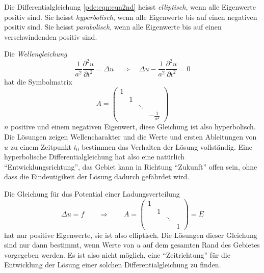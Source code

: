 \begin{definition}
Die Differentialgleichung
\eqref{pde:eqn:eqn2nd}
heisst {\em elliptisch}, wenn alle Eigenwerte positiv sind.
Sie heisst {\em hyperbolisch}, wenn alle Eigenwerte bis auf einen negativen
positiv sind.
Sie heisst {\em parabolisch}, wenn alle Eigenwerte bis auf einen
verschwindenden positiv sind.
\end{definition}
%
%
%
%
%
%

\begin{beispiel}
Die {\em Wellengleichung}
%
\[
\frac{1}{a^2}\frac{\partial^2 u}{\partial t^2}
=
\Delta u 
\quad\Rightarrow\quad
\Delta u 
-
\frac{1}{a^2}\frac{\partial^2 u}{\partial t^2}
=
0
\]
hat die Symbolmatrix
\[
A=
\begin{pmatrix}
1& &      &              \\
 &1&      &              \\
 & &\ddots&              \\
 & &      &\displaystyle-\frac{1}{a^2}
\end{pmatrix}
\]
$n$ positive und einem negativen Eigenwert, diese Gleichung ist also
hyperbolisch.
Die Lösungen zeigen Wellencharakter und die Werte und ersten
Ableitungen von $u$ zu einem Zeitpunkt $t_0$ bestimmen das Verhalten
der Lösung vollständig.
Eine hyperbolische Differentialgleichung hat also eine natürlich
``Entwicklungsrichtung'', das Gebiet kann in Richtung ``Zukunft''
offen sein, ohne dass die Eindeutigikeit der Lösung dadurch gefährdet wird.
\end{beispiel}

\begin{beispiel}
Die Gleichung für das Potential einer Ladungsverteilung
%
\[
\Delta u = f
\qquad\Rightarrow\qquad
A=
\begin{pmatrix}
1& &      & \\
 &1&      & \\
 & &\ddots& \\
 & &      &1
\end{pmatrix}
=E
\]
hat nur positive Eigenwerte, sie ist also elliptisch.
Die Lösungen dieser Gleichung sind nur dann bestimmt, wenn Werte von $u$
auf dem gesamten Rand des Gebietes vorgegeben werden.
Es ist also nicht möglich, eine ``Zeitrichtung'' für die Entwicklung
der Lösung einer solchen Differentialgleichung zu finden.
%
\end{beispiel}

